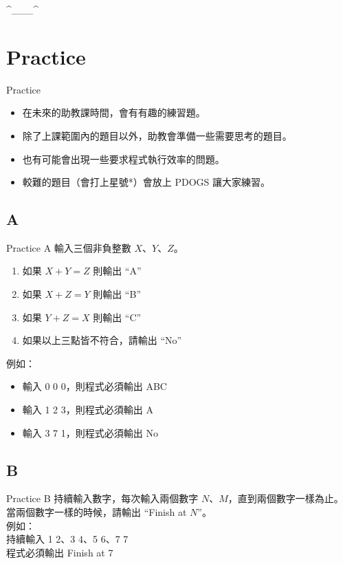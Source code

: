 \documentclass[t]{beamer}
\begin{document}
\begin{frame}{\textasciicircum\_\_\_\textasciicircum}
  
\end{frame}

\section{Practice}
\begin{frame}{Practice}
  \begin{itemize}
    \item 在未來的助教課時間，會有有趣的練習題。
    \item 除了上課範圍內的題目以外，助教會準備一些需要思考的題目。
    \item 也有可能會出現一些要求程式執行效率的問題。
    \item 較難的題目（會打上星號*）會放上 PDOGS 讓大家練習。
  \end{itemize}
\end{frame}

\subsection{A}
\begin{frame}{Practice A}
  輸入三個非負整數 $X$、$Y$、$Z$。
  \begin{enumerate}
    \item
    如果 $X + Y = Z$ 則輸出 ``A''
    \item
    如果 $X + Z = Y$ 則輸出 ``B''
    \item
    如果 $Y + Z = X$ 則輸出 ``C''
    \item
    如果以上三點皆不符合，請輸出 ``No''
  \end{enumerate}
  \vspace{1em}
  例如：\\
  \begin{itemize}
    \item 輸入 0 0 0，則程式必須輸出 ABC
    \item 輸入 1 2 3，則程式必須輸出 A
    \item 輸入 3 7 1，則程式必須輸出 No
  \end{itemize}
\end{frame}

\subsection{B}
\begin{frame}{Practice B}
  持續輸入數字，每次輸入兩個數字 $N$、$M$，直到兩個數字一樣為止。\\
  當兩個數字一樣的時候，請輸出 ``Finish at $N$''。\\
  \vspace{1em}
  例如：\\
  持續輸入 1 2、3 4、5 6、7 7\\
  程式必須輸出 Finish at 7
\end{frame}
\end{document}

